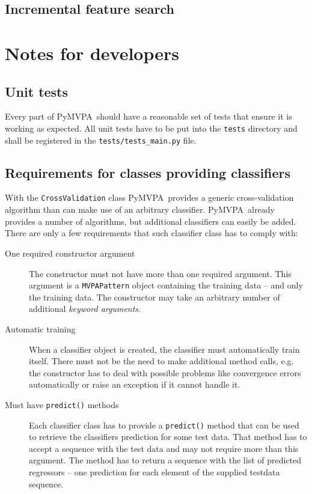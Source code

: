 \documentclass[a4paper,11pt]{scrartcl}
\newcommand{\pymvpa}{PyMVPA~}
\newcommand{\code}[1]{\texttt{#1}}
\begin{document}
\subsection{Incremental feature search}



\section{Notes for developers}
\subsection{Unit tests}
Every part of \pymvpa should have a reasonable set of tests that ensure it is
working as expected. All unit tests have to be put into the \code{tests}
directory and shall be registered in the \code{tests/tests\_main.py} file.

\subsection{Requirements for classes providing classifiers}
With the \code{CrossValidation} class \pymvpa provides a generic cross-validation
algorithm than can make use of an arbitrary classifier. \pymvpa already provides
a number of algorithms, but additional classifiers can easily be added. There
are only a few requirements that such classifier class has to comply with:

\begin{description}
 \item[One required constructor argument] The constructor must not have more
    than one required argument. This argument is a \code{MVPAPattern} object
    containing the training data -- and only the training data. The constructor
    may take an arbitrary number of additional \textit{keyword arguments}.
 \item[Automatic training] When a classifier object is created, the classifier
    must automatically train itself. There must not be the need to make
    additional method calls, e.g. the constructor has to deal with possible
    problems like convergence errors automatically or raise an exception if it
    cannot handle it.
 \item[Must have \code{predict()} methods] Each classifier class has to provide
    a \code{predict()} method that can be used to retrieve the classifiers
    prediction for some test data. That method has to accept a sequence with the
    test data and may not require more than this argument. The method has to
    return a sequence with the list of predicted regressors -- one prediction
    for each element of the supplied testdata sequence.
 \end{description}
\end{document}
